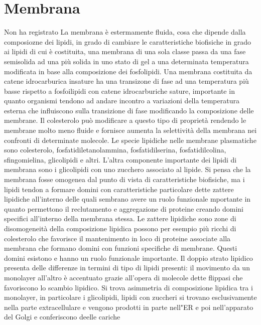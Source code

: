 \chapter{Membrana}

Non ha registrato La membrana \`e estermamente fluida, cosa che dipende dalla composiozne dei lipidi, in grado di cambiare le caratteristiche biofisiche in grado ai lipidi di cui 
\`e costituita, una membrana di una sola classe passa da una fase semisolida ad una pi\`u solida in uno stato di gel a una determinata temperatura modificata in base alla composizione
dei fosfolipidi. Una membrana costituita da catene idrocarburica insature ha una transizone di fase ad una temperatura pi\`u basse rispetto a fosfoilipidi con catene idrocarburiche
sature, importante in quanto organismi tendono ad andare incontro a variazioni della temperatura esterna che influiscono sulla transizione di fase modificando la composizione delle 
membrane. Il colesterolo pu\`o modificare a questo tipo di propriet\`a rendendo le membrane molto meno fluide e fornisce aumenta la selettivit\`a della membrana nei confronti di 
determinate molecole. Le specie lipidiche nelle membrane plasmatiche sono colesterolo, fosfatidiletanolammina, fosfatidilserina, fosfatidilcolina, sfingomielina, glicolipidi e altri. 
L'altra componente importante dei lipidi di membrana sono i glicolipidi con uno zucchero associato al lipide. Si pensa che la membrana fosse omogenea dal punto di vista di caratteristiche
biofisiche, ma i lipidi tendon a formare domini con caratteristiche particolare dette zattere lipidiche all'interno delle quali sembrano avere un ruolo funzionale mportante in quanto 
permettono il reclutamento e aggregazione di proteine creando domini specifici all'interno della membrana stessa. Le zattere lipidiche sono zone di disomogeneit\`a della composizione 
lipidica possono per esempio pi\`u ricchi di colesterolo che favorisce il mantenimento in loco di proteine associate alla membrana che formano domini con funzioni specifiche di membrane.
Questi domini esistono e hanno un ruolo funzionale importante. Il doppio strato lipidico presenta delle differenze in termini di tipo di lipidi presenti: il movimento da un monolayer 
all'altro \`e accentuato grazie all'opera di molecole dette flippasi che favoriscono lo scambio lipidico. Si trova asimmetria di composizione lipidica tra i monolayer, in particolare
i glicolipidi, lipidi con zuccheri si trovano esclusivamente nella parte extracellulare e vengono prodotti in parte nell"ER e poi nell'apparato del Golgi e conferiscono deelle cariche
